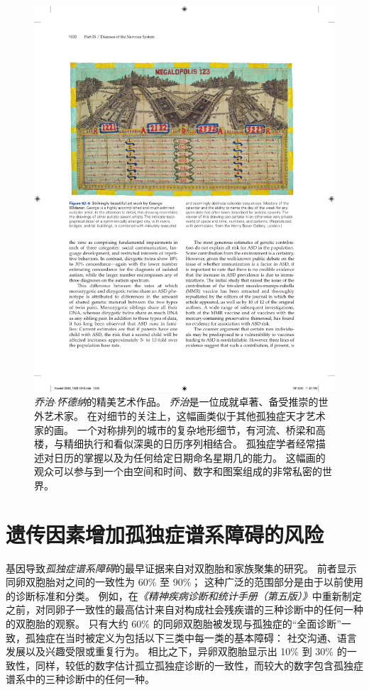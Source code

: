 \begin{figure}[htbp]
	\centering
	\includegraphics[width=0.9\linewidth]{chap62/fig_62_6}
	\caption{\textit{乔治$\cdot$怀德纳}的精美艺术作品。
		\textit{乔治}是一位成就卓著、备受推崇的世外艺术家。
		在对细节的关注上，这幅画类似于其他孤独症天才艺术家的画。
		一个对称排列的城市的复杂地形细节，有河流、桥梁和高楼，与精细执行和看似深奥的日历序列相结合。
		孤独症学者经常描述对日历的掌握以及为任何给定日期命名星期几的能力。
		这幅画的观众可以参与到一个由空间和时间、数字和图案组成的非常私密的世界。}
	\label{fig:62_6}
\end{figure}



\section{遗传因素增加孤独症谱系障碍的风险}

基因导致\textit{孤独症谱系障碍}的最早证据来自对双胞胎和家族聚集的研究。
前者显示同卵双胞胎对之间的一致性为 60\% 至 90\%；
这种广泛的范围部分是由于以前使用的诊断标准和分类。
例如，在\textit{《精神疾病诊断和统计手册（第五版）》}中重新制定之前，对同卵子一致性的最高估计来自对构成社会残疾谱的三种诊断中的任何一种的双胞胎的观察。
只有大约 60\% 的同卵双胞胎被发现与孤独症的“全面诊断”一致，孤独症在当时被定义为包括以下三类中每一类的基本障碍：
社交沟通、语言发展以及兴趣受限或重复行为。
相比之下，异卵双胞胎显示出 10\% 到 30\% 的一致性，同样，较低的数字估计孤立孤独症诊断的一致性，而较大的数字包含孤独症谱系中的三种诊断中的任何一种。


